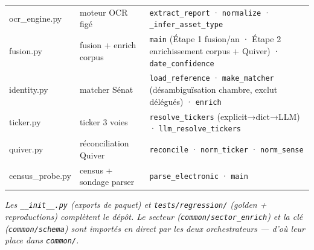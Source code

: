 \documentclass[11pt,a4paper]{article}
\newcommand{\co}[1]{\texttt{\small #1}}
\begin{document}
{\begin{longtable}{>{\ttfamily\footnotesize}p{2.6cm} p{3.9cm} p{8.6cm}}
ocr_engine.py & moteur OCR figé & \co{extract_report} · \co{normalize} · \co{_infer_asset_type} \\
fusion.py & fusion + enrich corpus & \co{main} (Étape 1 fusion/an · Étape 2 enrichissement corpus + Quiver) · \co{date_confidence} \\
identity.py & matcher Sénat & \co{load_reference} · \co{make_matcher} (désambiguïsation chambre, exclut délégués) · \co{enrich} \\
ticker.py & ticker 3 voies & \co{resolve_tickers} (explicit→dict→LLM) · \co{llm_resolve_tickers} \\
quiver.py & réconciliation Quiver & \co{reconcile} · \co{norm_ticker} · \co{norm_sense} \\
census_probe.py & census + sondage parser & \co{parse_electronic} · \co{main} \\
\bottomrule
\end{longtable}}
\textit{Les \co{__init__.py} (exports de paquet) et \co{tests/regression/} (golden + reproductions)
complètent le dépôt. Le secteur (\co{common/sector_enrich}) et la clé (\co{common/schema}) sont importés
\emph{en direct} par les deux orchestrateurs — d'où leur place dans \co{common/}.}
\end{document}
